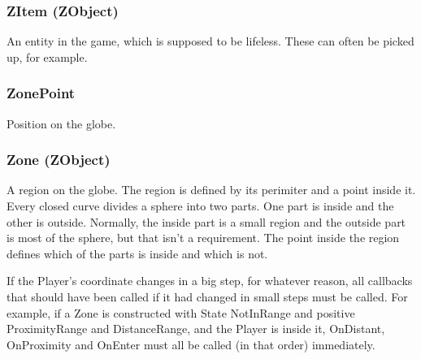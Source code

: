 \documentclass{article}
\begin{document}
\subsubsection{ZItem (ZObject)}
An entity in the game, which is supposed to be lifeless. These can often be picked up, for example.

\subsubsection{ZonePoint}
Position on the globe.

\subsubsection{Zone (ZObject)}
A region on the globe. The region is defined by its perimiter and a point
inside it. Every closed curve divides a sphere into two parts. One part is
inside and the other is outside. Normally, the inside part is a small region
and the outside part is most of the sphere, but that isn't a requirement. The
point inside the region defines which of the parts is inside and which is not.

If the Player's coordinate changes in a big step, for whatever reason, all callbacks that should have been called if it had changed in small steps must be called. For example, if a Zone is constructed with State NotInRange and positive ProximityRange and DistanceRange, and the Player is inside it, OnDistant, OnProximity and OnEnter must all be called (in that order) immediately.
\end{document}
